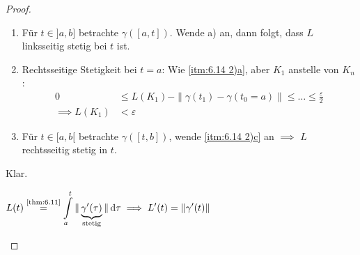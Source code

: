\begin{theorem}[Hilfssatz]
\begin{proof}
\begin{enum-arab}
\begin{enumerate}
        \item \label{itm:6.14 2)b} Für $t \in ]a,b]$ betrachte $\gamma([a,t])$. Wende a) an, dann folgt, dass $L$ linksseitig stetig bei $t$ ist.
        
        \item \label{itm:6.14 2)c} Rechtsseitige Stetigkeit bei $t = a$: Wie \ref{itm:6.14 2)a}, aber $K_1$ anstelle von $K_n$:
        \begin{align*}
          0 &\leq L(K_1) - \|\gamma(t_1) - \gamma(t_0 = a)\| \leq \ldots \leq \frac{\varepsilon}{2} \\
          \implies L(K_1) &< \varepsilon
        \end{align*}
        
        \item Für $t \in [a,b[$ betrachte $\gamma([t,b])$, wende \ref{itm:6.14 2)c} an $\implies$ $L$ rechtsseitig stetig in $t$.
      \end{enumerate}
      
      \item Klar.
      
      \item $\displaystyle L(t) \overset{\text{\ref{thm:6.11}}}{=} \int\limits_{a}^{t} \|\underbrace{\gamma'(\tau)}_{\text{stetig}}\| \, \mathrm{d}\tau \implies L'(t) = \|\gamma'(t)\|$
    \end{enum-arab}
  \end{proof}
\end{theorem}

